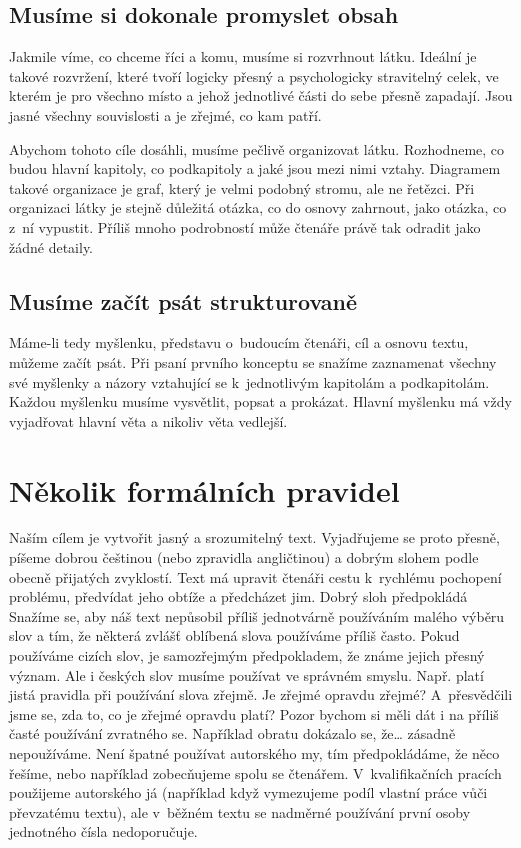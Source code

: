 \documentclass{template/socthesis}
\begin{document}
\section{Musíme si dokonale promyslet obsah}
Jakmile víme, co chceme říci a komu, musíme si rozvrhnout látku.
Ideální je takové rozvržení, které tvoří logicky přesný a psychologicky stravitelný celek, ve kterém je pro všechno místo a jehož jednotlivé části do sebe přesně zapadají.
Jsou jasné všechny souvislosti a je zřejmé, co kam patří.

Abychom tohoto cíle dosáhli, musíme pečlivě organizovat látku.
Rozhodneme, co budou hlavní kapitoly, co podkapitoly a jaké jsou mezi nimi vztahy.
Diagramem takové organizace je graf, který je velmi podobný stromu, ale ne řetězci.
Při organizaci látky je stejně důležitá otázka, co do osnovy zahrnout, jako otázka, co z~ní vypustit.
Příliš mnoho podrobností může čtenáře právě tak odradit jako žádné detaily.

\section{Musíme začít psát strukturovaně}
Máme-li tedy myšlenku, představu o~budoucím čtenáři, cíl a osnovu textu, můžeme začít psát.
Při psaní prvního konceptu se snažíme zaznamenat všechny své myšlenky a názory vztahující se k~jednotlivým kapitolám a podkapitolám.
Každou myšlenku musíme vysvětlit, popsat a prokázat.
Hlavní myšlenku má vždy vyjadřovat hlavní věta a nikoliv věta vedlejší.


\chapter{Několik formálních pravidel}
Naším cílem je vytvořit jasný a srozumitelný text.
Vyjadřujeme se proto přesně, píšeme dobrou češtinou (nebo zpravidla angličtinou) a dobrým slohem podle obecně přijatých zvyklostí.
Text má upravit čtenáři cestu k~rychlému pochopení problému, předvídat jeho obtíže a předcházet jim.
Dobrý sloh předpokládá  Snažíme se, aby náš text nepůsobil příliš jednotvárně používáním malého výběru slov a tím, že některá zvlášť oblíbená slova používáme příliš často.
Pokud používáme cizích slov, je samozřejmým předpokladem, že známe jejich přesný význam.
Ale i českých slov musíme používat ve správném smyslu.
Např.
platí jistá pravidla při používání slova zřejmě.
Je zřejmé opravdu zřejmé? A~přesvědčili jsme se, zda to, co je zřejmé opravdu platí? Pozor bychom si měli dát i na příliš časté používání zvratného se.
Například obratu dokázalo se, že… zásadně nepoužíváme.
Není špatné používat autorského my, tím předpokládáme, že něco řešíme, nebo například zobecňujeme spolu se čtenářem.
V~kvalifikačních pracích použijeme autorského já (například když vymezujeme podíl vlastní práce vůči převzatému textu), ale v~běžném textu se nadměrné používání první osoby jednotného čísla nedoporučuje.
\end{document}
